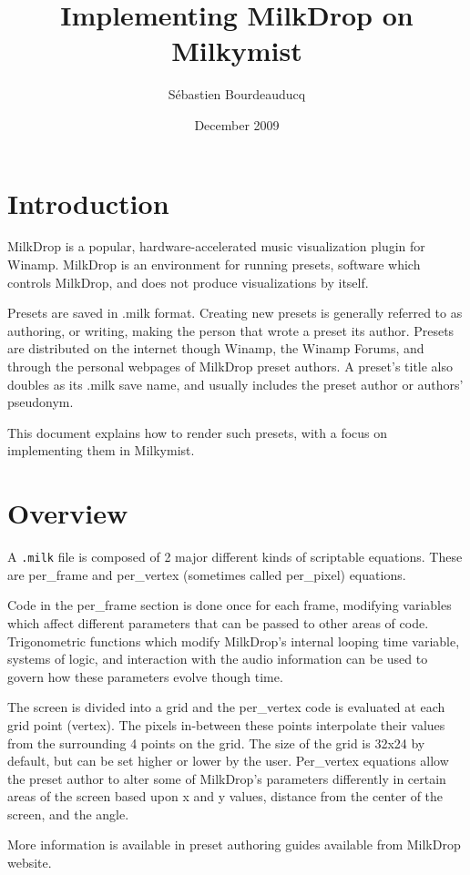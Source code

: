 \documentclass[a4paper,11pt]{article}
\title{Implementing MilkDrop on Milkymist}
\author{S\'ebastien Bourdeauducq}
\date{December 2009}
\begin{document}
\setlength{\parindent}{0pt}
\setlength{\parskip}{5pt}
\maketitle{}
\section{Introduction}
MilkDrop is a popular, hardware-accelerated music visualization plugin for Winamp. MilkDrop is an environment for running presets, software which controls MilkDrop, and does not produce visualizations by itself.

Presets are saved in .milk format. Creating new presets is generally referred to as authoring, or writing, making the person that wrote a preset its author. Presets are distributed on the internet though Winamp, the Winamp Forums, and through the personal webpages of MilkDrop preset authors. A preset's title also doubles as its .milk save name, and usually includes the preset author or authors' pseudonym.

This document explains how to render such presets, with a focus on implementing them in Milkymist.

\section{Overview}
A \verb!.milk! file is composed of 2 major different kinds of scriptable equations. These are per\_frame and per\_vertex (sometimes called per\_pixel) equations.

Code in the per\_frame section is done once for each frame, modifying variables which affect different parameters that can be passed to other areas of code. Trigonometric functions which modify MilkDrop's internal looping time variable, systems of logic, and interaction with the audio information can be used to govern how these parameters evolve though time.

The screen is divided into a grid and the per\_vertex code is evaluated at each grid point (vertex). The pixels in-between these points interpolate their values from the surrounding 4 points on the grid. The size of the grid is 32x24 by default, but can be set higher or lower by the user. Per\_vertex equations allow the preset author to alter some of MilkDrop's parameters differently in certain areas of the screen based upon x and y values, distance from the center of the screen, and the angle.

More information is available in preset authoring guides available from MilkDrop website.
\end{document}
